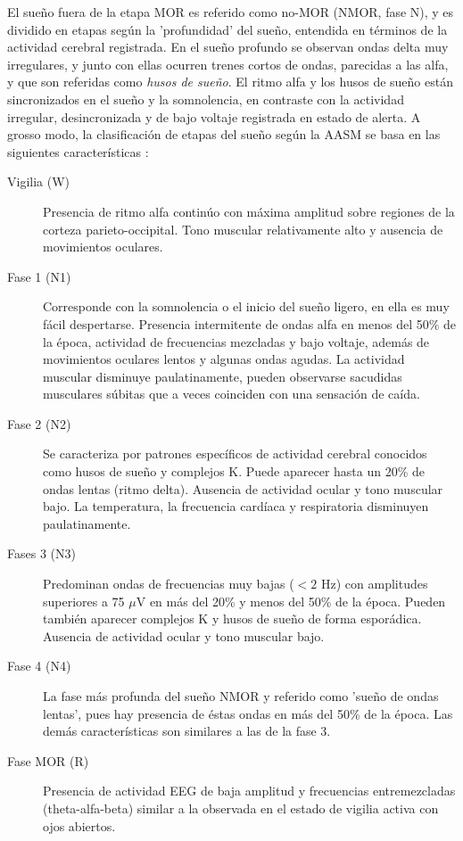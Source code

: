 El sue\~no fuera de la etapa MOR es referido como no-MOR (NMOR, fase N), y es dividido en etapas 
seg\'un la 'profundidad' del sue\~no, entendida en t\'erminos de la actividad cerebral registrada.
En el sue\~no profundo se observan ondas delta muy irregulares, y junto con ellas ocurren trenes 
cortos de ondas, parecidas a las alfa, y que son referidas como \textit{husos de sue\~no}. 
El ritmo alfa y los husos de sue\~no est\'an sincronizados en el sue\~no y la somnolencia, en 
contraste con la actividad irregular, desincronizada y de bajo voltaje registrada en estado de 
alerta.
A grosso modo, la clasificaci\'on de etapas del sue\~no seg\'un la AASM se basa en las siguientes
caracter\'isticas \cite{Hori01}:

\begin{description}
\item[Vigilia (W)] Presencia de ritmo alfa contin\'uo con m\'axima amplitud sobre regiones de la 
corteza parieto-occipital. Tono muscular relativamente alto y ausencia de movimientos oculares.

\item[Fase 1 (N1)] Corresponde con la somnolencia o el inicio del sue\~no ligero, en ella es muy 
f\'acil despertarse. 
Presencia intermitente de ondas alfa en menos del 50\% de la \'epoca, actividad de frecuencias 
mezcladas y bajo voltaje, adem\'as de movimientos oculares lentos y algunas ondas agudas. 
La actividad muscular disminuye paulatinamente, pueden observarse sacudidas musculares s\'ubitas 
que a veces coinciden con una sensaci\'on de ca\'ida. 

\item[Fase 2 (N2)] Se caracteriza por patrones espec\'ificos de actividad cerebral conocidos como 
husos de sue\~no y complejos K. 
Puede aparecer hasta un 20\% de ondas lentas (ritmo delta). Ausencia de actividad ocular y tono 
muscular bajo.
La temperatura, la frecuencia card\'iaca y respiratoria disminuyen paulatinamente. 

\item[Fases 3 (N3)] Predominan ondas de frecuencias muy bajas ($<2$ Hz) con amplitudes superiores a 
75 $\mu$V en m\'as del 20\% y menos del 50\% de la \'epoca. Pueden tambi\'en aparecer complejos K y 
husos de sue\~no de forma espor\'adica. Ausencia de actividad ocular y tono muscular bajo.

\item[Fase 4 (N4)] La fase m\'as profunda del sue\~no NMOR y referido como 'sue\~no de ondas 
lentas', pues hay presencia de \'estas ondas en m\'as del 50\% de la \'epoca. Las dem\'as 
caracter\'isticas son similares a las de la fase 3.

\item[Fase MOR (R)] Presencia de actividad EEG de baja amplitud y frecuencias entremezcladas 
(theta-alfa-beta) similar a la observada en el estado de vigilia activa con ojos abiertos.
\end{description}

